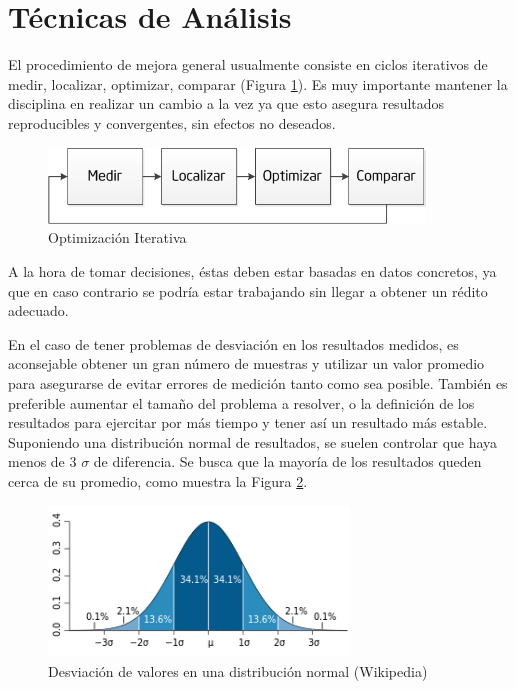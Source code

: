 \documentclass[a4paper]{report}
\begin{document}
\section{Técnicas de Análisis}

El procedimiento de mejora general usualmente consiste en ciclos iterativos de medir, localizar, optimizar,
comparar (Figura \ref{fig:cycle}). Es muy importante mantener la disciplina en realizar un cambio a la
vez ya que esto asegura resultados reproducibles y convergentes, sin efectos no deseados.

\begin{figure}[H]
\begin{center}
\includegraphics[width=10cm]{cycle.png}
\caption{Optimización Iterativa}
\label{fig:cycle}
\end{center}
\end{figure}

A la hora de tomar decisiones, éstas deben estar basadas en datos concretos, ya que en caso contrario se podría estar trabajando sin llegar a obtener un rédito adecuado.

\bigskip

En el caso de tener problemas de desviación en los resultados medidos, es aconsejable obtener un gran número de muestras y utilizar un valor promedio para asegurarse de evitar errores de medición tanto como sea posible. También es preferible aumentar el tamaño del problema a resolver, o la definición de los resultados para ejercitar por más tiempo y tener así un resultado más estable.
Suponiendo una distribución normal de resultados, se suelen controlar que haya menos de 3 $ \sigma $ de diferencia. Se busca que la mayoría de los resultados queden cerca de su promedio, como muestra la Figura \ref{fig:deviation}.

\begin{figure}[H]
\label{fig:deviation}
\begin{center}
\includegraphics[width=8cm]{deviation.png}
\caption{Desviación de valores en una distribución normal (Wikipedia)}
\end{center}
\end{figure}
\end{document}
